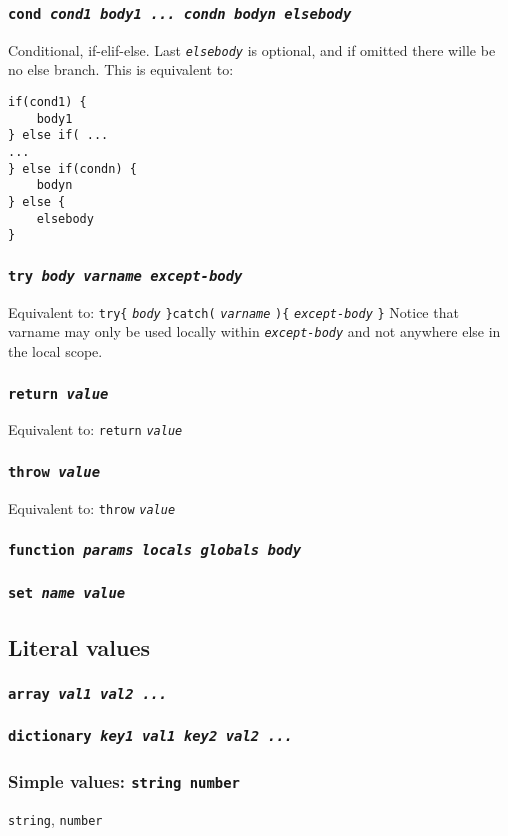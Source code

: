 \documentclass[10pt]{article}
\newcommand{\ch}[1]{{\tt\em #1}}
\begin{document}
\subsubsection{\tt cond \em cond1 body1 ... condn bodyn elsebody}
Conditional, if-elif-else. Last \ch{elsebody} is optional, and if omitted there wille be no else branch.
This is equivalent to:
\begin{verbatim}
if(cond1) {
    body1
} else if( ...
...
} else if(condn) {
    bodyn
} else {
    elsebody
}
\end{verbatim}
\subsubsection{\tt try \em body varname except-body}
Equivalent to: \verb|try{| \ch{body} \verb|}catch(| \ch{varname} \verb|){| \ch{except-body} \verb|}|
Notice that varname may only be used locally within \ch{except-body} and not anywhere else in the local scope.
\subsubsection{\tt return \em value}
Equivalent to: \verb|return| \ch{value}
\subsubsection{\tt throw \em value}
Equivalent to: \verb|throw| \ch{value}
\subsubsection{\tt function \em params locals globals body}
\subsubsection{\tt set \em name value}

\subsection{Literal values}
\subsubsection{\tt array \em val1 val2 ...}
\subsubsection{\tt dictionary \em key1 val1 key2 val2 ...}
\subsubsection{Simple values: \tt string number} 
{\tt string}, {\tt number}
\end{document}

